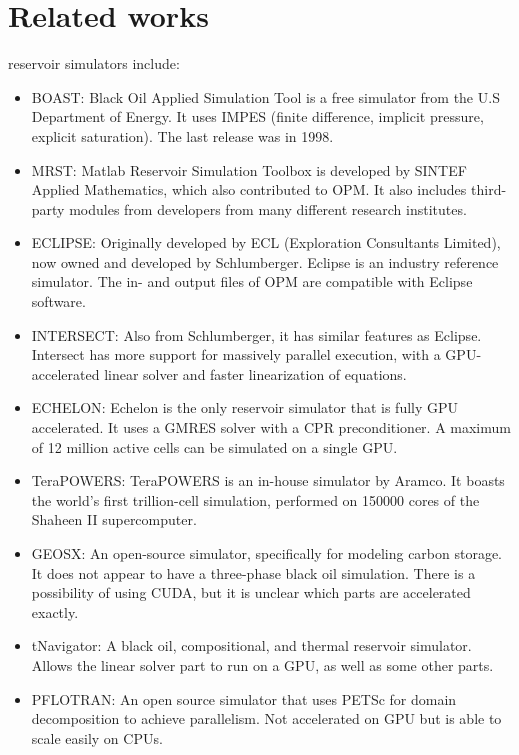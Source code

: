 \section{Related works}
\label{sec:relres}

 reservoir simulators include:\\

\begin{itemize}
\item BOAST\cite{boast1,boast2}: Black Oil Applied Simulation Tool is a free simulator from the U.S Department of Energy. It uses IMPES (finite difference, implicit pressure, explicit saturation). The last release was in 1998.
\item MRST\cite{mrst}: Matlab Reservoir Simulation Toolbox is developed by SINTEF Applied Mathematics, which also contributed to OPM. It also includes third-party modules from developers from many different research institutes.
\item ECLIPSE\cite{eclipse}: Originally developed by ECL (Exploration Consultants Limited), now owned and developed by Schlumberger. Eclipse is an industry reference simulator. The in- and output files of OPM are compatible with Eclipse software.
\item INTERSECT\cite{intersect}: Also from Schlumberger, it has similar features as Eclipse. Intersect has more support for massively parallel execution, with a GPU-accelerated linear solver and faster linearization of equations.
\item ECHELON\cite{echelon}: Echelon is the only reservoir simulator that is fully GPU accelerated. It uses a GMRES solver with a CPR preconditioner. A maximum of 12 million active cells can be simulated on a single GPU.
\item TeraPOWERS\cite{terapowers}: TeraPOWERS is an in-house simulator by Aramco. It boasts the world's first trillion-cell simulation, performed on 150000 cores of the Shaheen II supercomputer\cite{shaheen}.
\item GEOSX\cite{geosx}: An open-source simulator, specifically for modeling carbon storage. It does not appear to have a three-phase black oil simulation. There is a possibility of using CUDA, but it is unclear which parts are accelerated exactly.
\item tNavigator\cite{tnavigator}: A black oil, compositional, and thermal reservoir simulator. Allows the linear solver part to run on a GPU, as well as some other parts.
\item PFLOTRAN\cite{pflotran}: An open source simulator that uses PETSc\cite{petsc} for domain decomposition to achieve parallelism. Not accelerated on GPU but is able to scale easily on CPUs.
\end{itemize}

